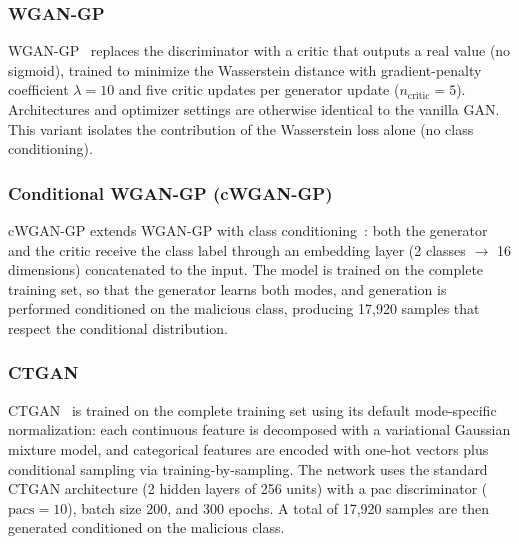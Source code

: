 ﻿\documentclass[journal]{IEEEtran}
\begin{document}
\subsubsection{WGAN-GP}
\label{sec:wgan}
WGAN-GP~\cite{gulrajani2017wgangp} replaces the discriminator with a critic that outputs a real value (no sigmoid), trained to minimize the Wasserstein distance with gradient-penalty coefficient $\lambda{=}10$ and five critic updates per generator update ($n_{\mathrm{critic}}{=}5$). Architectures and optimizer settings are otherwise identical to the vanilla GAN. This variant isolates the contribution of the Wasserstein loss alone (no class conditioning).

\subsubsection{Conditional WGAN-GP (cWGAN-GP)}
\label{sec:cwgan}
cWGAN-GP extends WGAN-GP with class conditioning~\cite{mirza2014cgan,yao2025cwgangp}: both the generator and the critic receive the class label through an embedding layer (2 classes $\rightarrow$ 16 dimensions) concatenated to the input. The model is trained on the complete training set, so that the generator learns both modes, and generation is performed conditioned on the malicious class, producing 17{,}920 samples that respect the conditional distribution.

\subsubsection{CTGAN}
CTGAN~\cite{xu2019ctgan} is trained on the complete training set using its default mode-specific normalization: each continuous feature is decomposed with a variational Gaussian mixture model, and categorical features are encoded with one-hot vectors plus conditional sampling via training-by-sampling. The network uses the standard CTGAN architecture (2 hidden layers of 256 units) with a pac discriminator ($\mathrm{pacs}{=}10$), batch size 200, and 300 epochs. A total of 17{,}920 samples are then generated conditioned on the malicious class.
\end{document}
